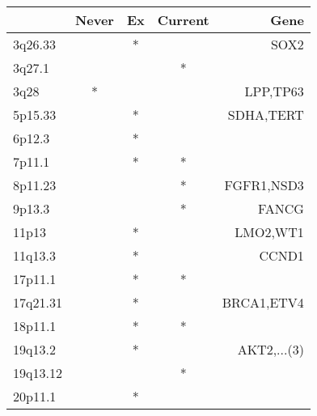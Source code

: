 \begin{tabular}{lcccr}
\toprule
{} & Never & Ex & Current &         Gene \\
\midrule
3q26.33  &       &  * &         &         SOX2 \\
3q27.1   &       &    &       * &              \\
3q28     &     * &    &         &     LPP,TP63 \\
5p15.33  &       &  * &         &    SDHA,TERT \\
6p12.3   &       &  * &         &              \\
7p11.1   &       &  * &       * &              \\
8p11.23  &       &    &       * &   FGFR1,NSD3 \\
9p13.3   &       &    &       * &        FANCG \\
11p13    &       &  * &         &     LMO2,WT1 \\
11q13.3  &       &  * &         &        CCND1 \\
17p11.1  &       &  * &       * &              \\
17q21.31 &       &  * &         &   BRCA1,ETV4 \\
18p11.1  &       &  * &       * &              \\
19q13.2  &       &  * &         &  AKT2,...(3) \\
19q13.12 &       &    &       * &              \\
20p11.1  &       &  * &         &              \\
\bottomrule
\end{tabular}
